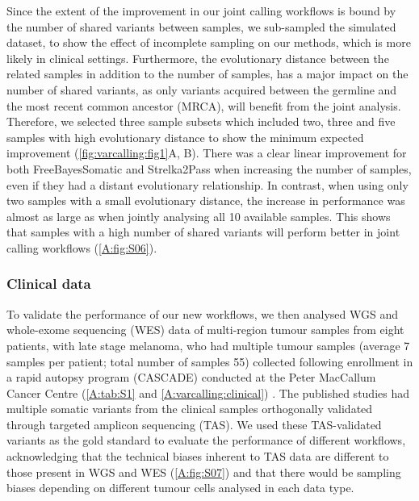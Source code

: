 Since the extent of the improvement in our joint calling workflows is bound by the number of shared variants between samples, we sub-sampled the simulated dataset, to show the effect of incomplete sampling on our methods, which is more likely in clinical settings. Furthermore, the evolutionary distance between the related samples in addition to the number of samples, has a major impact on the number of shared variants, as only variants acquired between the germline and the most recent common ancestor (MRCA), will benefit from the joint analysis. Therefore, we selected three sample subsets which included two, three and five samples with high evolutionary distance to show the minimum expected improvement (\autoref{fig:varcalling:fig1}A, B). There was a clear linear improvement for both FreeBayesSomatic and Strelka2Pass when increasing the number of samples, even if they had a distant evolutionary relationship. In contrast, when using only two samples with a small evolutionary distance, the increase in performance was almost as large as when jointly analysing all 10 available samples. This shows that samples with a high number of shared variants will perform better in joint calling workflows (\autoref{A:fig:S06}).

\cleardoublepage

\subsubsection{Clinical data}
\label{variantcalling-sec:realdata}
To validate the performance of our new workflows, we then analysed WGS and whole-exome sequencing (WES) data of multi-region tumour samples from eight patients, with late stage melanoma, who had multiple tumour samples (average 7 samples per patient; total number of samples 55) collected following enrollment in a rapid autopsy program (CASCADE) conducted at the Peter MacCallum Cancer Centre (\autoref{A:tab:S1} and \autoref{A:varcalling:clinical}) \parencite{Solomon2020, Vergara2021}. The published studies had multiple somatic variants from the clinical samples orthogonally validated through targeted amplicon sequencing (TAS). We used these TAS-validated variants as the gold standard to evaluate the performance of different workflows, acknowledging that the technical biases inherent to TAS data are different to those present in WGS and WES (\autoref{A:fig:S07}) and that there would be sampling biases depending on different tumour cells analysed in each data type.



